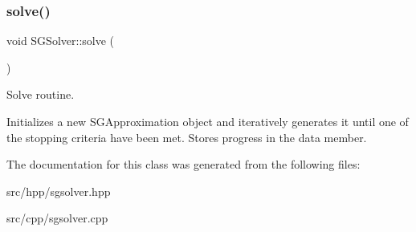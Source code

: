 \subsubsection{\texorpdfstring{solve()}{solve()}}
{\footnotesize\ttfamily void S\+G\+Solver\+::solve (\begin{DoxyParamCaption}{ }\end{DoxyParamCaption})}



Solve routine. 

Initializes a new S\+G\+Approximation object and iteratively generates it until one of the stopping criteria have been met. Stores progress in the data member. 

The documentation for this class was generated from the following files\+:\begin{DoxyCompactItemize}
\item 
src/hpp/sgsolver.\+hpp\item 
src/cpp/sgsolver.\+cpp\end{DoxyCompactItemize}
